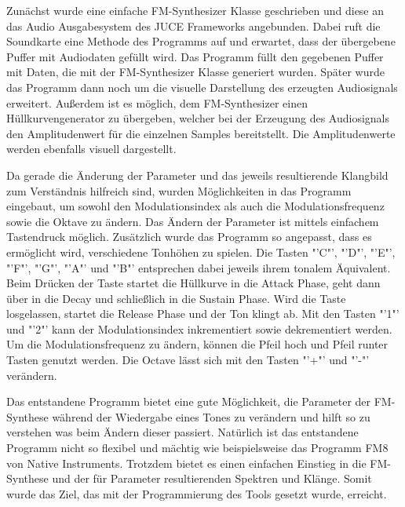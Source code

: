 Zunächst wurde eine einfache FM-Synthesizer Klasse geschrieben und diese an das Audio Ausgabesystem des JUCE Frameworks angebunden. Dabei ruft die Soundkarte eine Methode des Programms auf und erwartet, dass der übergebene Puffer mit Audiodaten gefüllt wird. Das Programm füllt den gegebenen Puffer mit Daten, die mit der FM-Synthesizer Klasse generiert wurden. Später wurde das Programm dann noch um die visuelle Darstellung des erzeugten Audiosignals erweitert. Außerdem ist es möglich, dem FM-Synthesizer einen Hüllkurvengenerator zu übergeben, welcher bei der Erzeugung des Audiosignals den Amplitudenwert für die einzelnen Samples bereitstellt. Die Amplitudenwerte werden ebenfalls visuell dargestellt.

Da gerade die Änderung der Parameter und das jeweils resultierende Klangbild zum Verständnis hilfreich sind, wurden Möglichkeiten in das Programm eingebaut, um sowohl den Modulationsindex als auch die Modulationsfrequenz sowie die Oktave zu ändern. Das Ändern der Parameter ist mittels einfachem Tastendruck möglich. Zusätzlich wurde das Programm so angepasst, dass es ermöglicht wird, verschiedene Tonhöhen zu spielen. Die Tasten "'C"', "'D"', "'E"', "'F"', "'G"', "'A"' und "'B"' entsprechen dabei jeweils ihrem tonalem Äquivalent. Beim Drücken der Taste startet die Hüllkurve in die Attack Phase, geht dann über in die Decay und schließlich in die Sustain Phase. Wird die Taste losgelassen, startet die Release Phase und der Ton klingt ab. Mit den Tasten "'1"' und "'2"' kann der Modulationsindex inkrementiert sowie dekrementiert werden. Um die Modulationsfrequenz zu ändern, können die Pfeil hoch und Pfeil runter Tasten genutzt werden. Die Octave lässt sich mit den Tasten "'+"' und "'-"' verändern.

Das entstandene Programm bietet eine gute Möglichkeit, die Parameter der FM-Synthese während der Wiedergabe eines Tones zu verändern und hilft so zu verstehen was beim Ändern dieser passiert. Natürlich ist das entstandene Programm nicht so flexibel und mächtig wie beispielsweise das Programm FM8 von Native Instruments. Trotzdem bietet es einen einfachen Einstieg in die FM-Synthese und der für Parameter resultierenden Spektren und Klänge. Somit wurde das Ziel, das mit der Programmierung des Tools gesetzt wurde, erreicht.
\FloatBarrier

